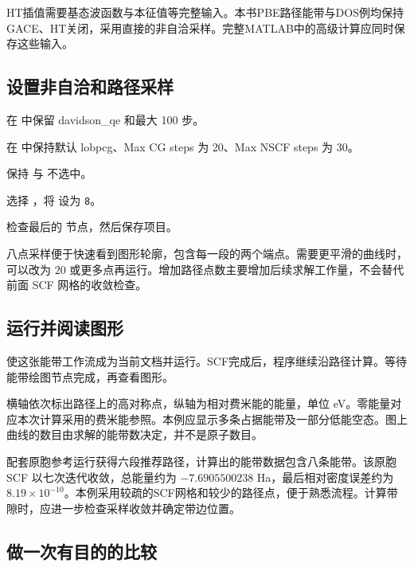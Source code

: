 HT插值需要基态波函数与本征值等完整输入。本书PBE路径能带与DOS例均保持GACE、HT关闭，采用直接的非自洽采样。完整MATLAB\regmark{}中的高级计算应同时保存这些输入。


\subsection{设置非自洽和路径采样}

\begin{steps}
\item 在  中保留 davidson\_qe 和最大 100 步。
\item 在  中保持默认 lobpcg、Max CG steps 为 20、Max NSCF steps 为 30。
\item 保持  与  不选中。
\item 选择 ，将 \mbox{} 设为 \texttt{8}。
\item 检查最后的  节点，然后保存项目。
\end{steps}

八点采样便于快速看到图形轮廓，包含每一段的两个端点。需要更平滑的曲线时，可以改为 $20$ 或更多点再运行。增加路径点数主要增加后续求解工作量，不会替代前面 SCF 网格的收敛检查。

\subsection{运行并阅读图形}

使这张能带工作流成为当前文档并运行。SCF完成后，程序继续沿路径计算。等待能带绘图节点完成，再查看图形。

横轴依次标出路径上的高对称点，纵轴为相对费米能的能量，单位 eV。零能量对应本次计算采用的费米能参照。本例应显示多条占据能带及一部分低能空态。图上曲线的数目由求解的能带数决定，并不是原子数目。


配套原胞参考运行获得六段推荐路径，计算出的能带数据包含八条能带。该原胞 SCF 以七次迭代收敛，总能量约为 $-7.6905500238$ Ha，最后相对密度误差约为 $8.19\times10^{-10}$。本例采用较疏的SCF网格和较少的路径点，便于熟悉流程。计算带隙时，应进一步检查采样收敛并确定带边位置。

\subsection{做一次有目的的比较}

